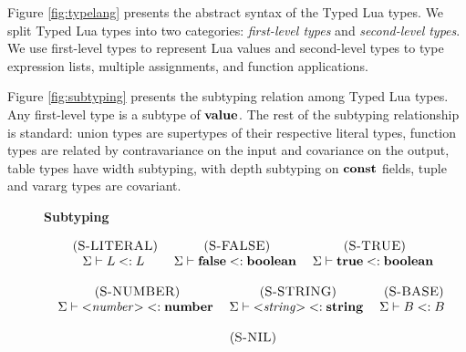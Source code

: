 Figure \ref{fig:typelang} presents the abstract syntax of the
Typed Lua types.
We split Typed Lua types into two categories:
\emph{first-level types} and \emph{second-level types}.
We use first-level types to represent Lua values and
second-level types to type expression lists, multiple assignments,
and function applications.

Figure \ref{fig:subtyping} presents the subtyping relation among
Typed Lua types.
Any first-level type is a subtype of $\mathbf{value}$.
The rest of the subtyping relationship is standard:
union types are supertypes of their respective literal types,
function types are related by contravariance on the input
and covariance on the output, table types have width subtyping,
with depth subtyping on $\mathbf{const}$ fields, tuple and vararg types
are covariant.

\begin{figure}[!ht]
\textbf{Subtyping}\\
\dstart
\begin{footnotesize}
$$
\begin{array}{c}
\begin{array}{c}
\mylabel{S-LITERAL}\\
\senv \vdash L \subtype L
\end{array}
\;
\begin{array}{c}
\mylabel{S-FALSE}\\
\senv \vdash \False \subtype \Boolean
\end{array}
\;
\begin{array}{c}
\mylabel{S-TRUE}\\
\senv \vdash \True \subtype \Boolean
\end{array}
\\ \\
\begin{array}{c}
\mylabel{S-NUMBER}\\
\senv \vdash {<}{\it number}{>} \subtype \Number
\end{array}
\;
\begin{array}{c}
\mylabel{S-STRING}\\
\senv \vdash {<}{\it string}{>} \subtype \String
\end{array}
\;
\begin{array}{c}
\mylabel{S-BASE}\\
\senv \vdash B \subtype B
\end{array}
\\ \\
\begin{array}{c}
\mylabel{S-NIL}\\

\end{array}
\end{array}$$
\end{footnotesize}
\end{figure}
